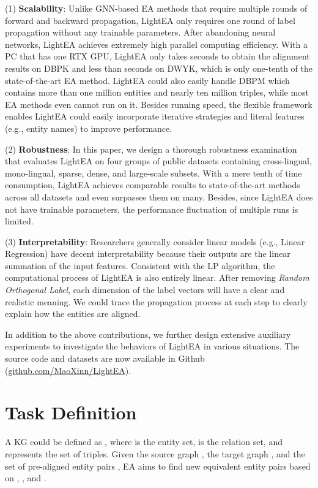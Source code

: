 \documentclass[11pt]{article}
\begin{document}
(1) \textbf{Scalability}:
Unlike GNN-based EA methods that require multiple rounds of forward and backward propagation, LightEA only requires one round of label propagation without any trainable parameters.
After abandoning neural networks, LightEA achieves extremely high parallel computing efficiency.
With a PC that has one RTX GPU, LightEA only takes  seconds to obtain the alignment results on DBPK and less than  seconds on DWYK, which is only one-tenth of the state-of-the-art EA method.
LightEA could also easily handle DBPM which contains more than one million entities and nearly ten million triples, while most EA methods even cannot run on it.
Besides running speed, the flexible framework enables LightEA could easily incorporate iterative strategies and literal features (e.g., entity names) to improve performance.

(2) \textbf{Robustness}:
In this paper, we design a thorough robustness examination that evaluates LightEA on four groups of public datasets containing cross-lingual, mono-lingual, sparse, dense, and large-scale subsets.
With a mere tenth of time consumption, LightEA achieves comparable results to state-of-the-art methods across all datasets and even surpasses them on many.
Besides, since LightEA does not have trainable parameters, the performance fluctuation of multiple runs is limited.

(3) \textbf{Interpretability}:
Researchers generally consider linear models (e.g., Linear Regression) have decent interpretability because their outputs are the linear summation of the input features.
Consistent with the LP algorithm, the computational process of LightEA is also entirely linear.
After removing \emph{Random Orthogonal Label}, each dimension of the label vectors will have a clear and realistic meaning.
We could trace the propagation process at each step to clearly explain how the entities are aligned.

In addition to the above contributions, we further design extensive auxiliary experiments to investigate the behaviors of LightEA in various situations.
The source code and datasets are now available in Github (\url{github.com/MaoXinn/LightEA}).

\section{Task Definition}
A KG could be defined as , where  is the entity set,  is the relation set, and  represents the set of triples.
Given the source graph , the target graph , and the set of pre-aligned entity pairs , EA aims to find new equivalent entity pairs based on , , and .
\end{document}
